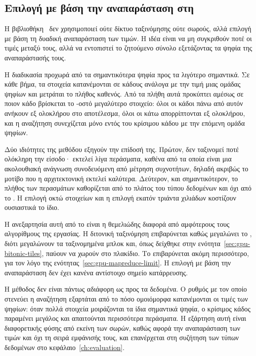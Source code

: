 \subsection{Επιλογή με βάση την αναπαράσταση στη }
\label{sec:gpu-reference-cub}

Η βιβλιοθήκη~\cite{cccl} δεν χρησιμοποιεί ούτε δίκτυο ταξινόμησης ούτε σωρούς, αλλά επιλογή
με βάση τη δυαδική αναπαράσταση των τιμών. Η ιδέα είναι να μη συγκριθούν ποτέ οι
τιμές μεταξύ τους, αλλά να εντοπιστεί το ζητούμενο σύνολο εξετάζοντας τα ψηφία
της αναπαράστασής τους.

Η διαδικασία προχωρά από τα σημαντικότερα ψηφία προς τα λιγότερο σημαντικά. Σε
κάθε βήμα, τα στοιχεία κατανέμονται σε κάδους ανάλογα με την τιμή μιας ομάδας
ψηφίων και μετράται το πλήθος καθενός. Από τα πλήθη αυτά προκύπτει αμέσως σε
ποιον κάδο βρίσκεται το -οστό μεγαλύτερο στοιχείο: όλοι οι κάδοι πάνω από
αυτόν ανήκουν εξ ολοκλήρου στο αποτέλεσμα, όλοι οι κάτω απορρίπτονται εξ
ολοκλήρου, και η αναζήτηση συνεχίζεται μόνο εντός του κρίσιμου κάδου με την
επόμενη ομάδα ψηφίων.

Δύο ιδιότητες της μεθόδου εξηγούν την επίδοσή της. Πρώτον, δεν ταξινομεί ποτέ
ολόκληρη την είσοδο· εκτελεί λίγα περάσματα, καθένα από τα οποία είναι μια
ακολουθιακή ανάγνωση συνοδευόμενη από μέτρηση συχνοτήτων, δηλαδή ακριβώς το
μοτίβο που η αρχιτεκτονική εκτελεί καλύτερα. Δεύτερον, και σημαντικότερον, το
πλήθος των περασμάτων καθορίζεται από το πλάτος του τύπου δεδομένων και όχι από
το . Η επιλογή οκτώ στοιχείων και η επιλογή εκατόν τριάντα χιλιάδων
κοστίζουν ουσιαστικά το ίδιο.

Η ανεξαρτησία αυτή από το  είναι η θεμελιώδης διαφορά από αμφότερους τους
αλγορίθμους της εργασίας. Η διτονική ταξινόμηση επιβαρύνεται καθώς μεγαλώνει το
, διότι μεγαλώνουν τα ταξινομημένα μπλοκ και, όπως δείχθηκε στην
ενότητα~\ref{sec:gpu-bitonic-tiles}, παύουν να χωρούν στο πλακίδιο. Το
 επιβαρύνεται ακόμη περισσότερο, για τον λόγο της
ενότητας~\ref{sec:gpu-mapreduce-limit}. Η επιλογή με βάση την αναπαράσταση δεν
έχει κανένα αντίστοιχο σημείο κατάρρευσης.

Η μέθοδος δεν είναι πάντως αδιάφορη ως προς τα δεδομένα. Ο ρυθμός με τον οποίο
στενεύει η αναζήτηση εξαρτάται από το πόσο ομοιόμορφα κατανέμονται οι τιμές των
ψηφίων: όταν πολλά στοιχεία μοιράζονται τα ίδια σημαντικά ψηφία, ο κρίσιμος
κάδος παραμένει μεγάλος και απαιτούνται περισσότερα περάσματα. Η εξάρτηση αυτή
είναι διαφορετικής φύσης από εκείνη των σωρών, καθώς αφορά την αναπαράσταση των
τιμών και όχι τη σειρά εμφάνισής τους, και επανέρχεται στη συζήτηση των τύπων
δεδομένων στο κεφάλαιο~\ref{ch:evaluation}.

